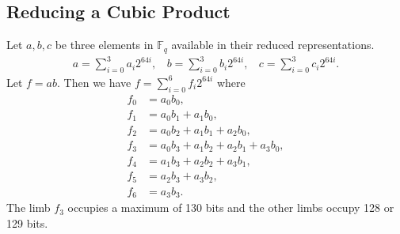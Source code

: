 \documentclass[a4paper, 12pt]{article}
\begin{document}
\subsection{Reducing a Cubic Product}%
\label{subsec:reducing_a_cubic_product}
Let $a,b,c$ be three elements in $\mathbb{F}_q$ available in their reduced representations.
\begin{align*}
  a = \sum^{3}_{i=0} a_i 2^{64i}, \ \ \ \ b = \sum^{3}_{i=0} b_i 2^{64i}, \ \ \ \ c = \sum^{3}_{i=0} c_i 2^{64i}.
\end{align*}
Let $f = ab$. Then we have $f = \sum_{i=0}^{6} f_i 2^{64i}$ where
\begin{align*}
  f_0 & = a_0b_0,\\
  f_1 & = a_0b_1 + a_1b_0,\\
  f_2 & = a_0b_2 + a_1b_1 + a_2b_0,\\
  f_3 & = a_0b_3 + a_1b_2 + a_2b_1 + a_3b_0,\\
  f_4 & = a_1b_3 + a_2b_2 + a_3b_1,\\
  f_5 & = a_2b_3 + a_3b_2,\\
  f_6 & = a_3b_3.
\end{align*}
The limb $f_3$ occupies a maximum of 130 bits and the other limbs occupy 128 or 129 bits.
\end{document}

